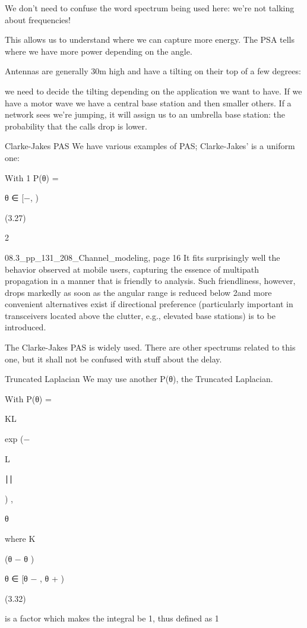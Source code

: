 {{{{We don't need to confuse the word spectrum being used here: we're not talking about frequencies!

This allows us to understand where we can capture more energy. The PSA tells where we have more power depending on the angle.

Antennas are generally 30m high and have a tilting on their top of a few degrees:

we need to decide the tilting depending on the application we want to have.
If we have a motor wave we have a central base station and then smaller others. If a network sees we're jumping, it will assign us to an umbrella base station: the probability that the calls drop is lower.

Clarke-Jakes PAS We have various examples of PAS; Clarke-Jakes' is a uniform one:

With 1 P(θ) =

θ ∈ [−\pi, \pi)

(3.27)

2\pi

08.3_pp_131_208_Channel_modeling, page 16 It fits surprisingly well the behavior observed at mobile users, capturing the essence of multipath propagation in a manner that is friendly to analysis. Such friendliness,
however, drops markedly as soon as the angular range is reduced below 2\pi and more convenient alternatives exist if directional preference (particularly important in transceivers located above the clutter, e.g., elevated base stations) is to be introduced.

The Clarke-Jakes PAS is widely used. There are other spectrums related to this one, but it shall not be confused with stuff about the delay.

Truncated Laplacian We may use another P(θ), the Truncated Laplacian.

With P(θ) =

KL

exp (−

L

∣∣

) ,


\sigma θ

where K

(θ − \mu θ )

θ ∈ [\mu θ − \pi, \mu θ + \pi)

(3.32)

is a factor which makes the integral be 1, thus defined as 1

}}}}
